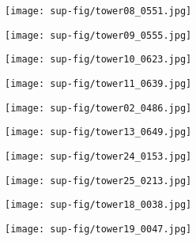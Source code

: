 \documentclass[10pt,twocolumn]{article}
\begin{document}
\begin{figure}[!hbtp]
    \centering
         \begin{subfigure}[b]{0.48\linewidth}
      \texttt{[image: sup-fig/tower08\_0551.jpg]}
     \end{subfigure}
     \GAP
     \begin{subfigure}[b]{0.48\linewidth}
      \texttt{[image: sup-fig/tower09\_0555.jpg]}
     \end{subfigure}
    \caption{\CAPOUR}
\end{figure}

\begin{figure}[!hbtp]
    \centering
         \begin{subfigure}[b]{0.48\linewidth}
      \texttt{[image: sup-fig/tower10\_0623.jpg]}
     \end{subfigure}
     \GAP
     \begin{subfigure}[b]{0.48\linewidth}
      \texttt{[image: sup-fig/tower11\_0639.jpg]}
     \end{subfigure}
    \caption{\CAPOUR}
\end{figure}

\begin{figure}[!hbtp]
    \centering
         \begin{subfigure}[b]{0.48\linewidth}
      \texttt{[image: sup-fig/tower02\_0486.jpg]}
     \end{subfigure}
     \GAP
     \begin{subfigure}[b]{0.48\linewidth}
      \texttt{[image: sup-fig/tower13\_0649.jpg]}
     \end{subfigure}
    \caption{\CAPOUR}
\end{figure}

\begin{figure}[!hbtp]
    \centering
         \begin{subfigure}[b]{0.48\linewidth}
      \texttt{[image: sup-fig/tower24\_0153.jpg]}
     \end{subfigure}
     \GAP
     \begin{subfigure}[b]{0.48\linewidth}
      \texttt{[image: sup-fig/tower25\_0213.jpg]}
     \end{subfigure}
    \caption{\CAPOUR}
\end{figure}

\begin{figure}[!hbtp]
    \centering
         \begin{subfigure}[b]{0.48\linewidth}
      \texttt{[image: sup-fig/tower18\_0038.jpg]}
     \end{subfigure}
     \GAP
     \begin{subfigure}[b]{0.48\linewidth}
      \texttt{[image: sup-fig/tower19\_0047.jpg]}
     \end{subfigure}
    \caption{\CAPOUR}
\end{figure}
\end{document}

